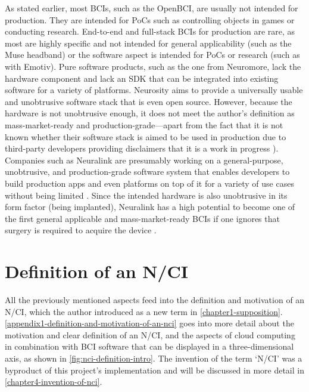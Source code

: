 As stated earlier, most BCIs, such as the OpenBCI, are usually not intended for production. They are intended for PoCs such as controlling objects in games or conducting research. End-to-end and full-stack BCIs for production are rare, as most are highly specific and not intended for general applicability (such as the Muse headband) or the software aspect is intended for PoCs or research (such as with Emotiv). Pure software products, such as the one from Neuromore, lack the hardware component and lack an SDK that can be integrated into existing software for a variety of platforms. Neurosity aims to provide a universally usable and unobtrusive software stack that is even open source. However, because the hardware is not unobtrusive enough, it does not meet the author’s definition as mass-market-ready and production-grade—apart from the fact that it is not known whether their software stack is aimed to be used in production \citep{neurosity_neurosity_2022} due to third-party developers providing disclaimers that it is a work in progress \citep{turney_notion_2022}). Companies such as Neuralink are presumably working on a general-purpose, unobtrusive, and production-grade software system that enables developers to build production apps and even platforms on top of it for a variety of use cases without being limited \citep{musk_integrated_2019}. Since the intended hardware is also unobtrusive in its form factor (being implanted), Neuralink has a high potential to become one of the first general applicable and mass-market-ready BCIs if one ignores that surgery is required to acquire the device \citep{neuralink_approach_nodate}.

\section{Definition of an N/CI}
\label{chapter2-definition-of-an-nci}

All the previously mentioned aspects feed into the definition and motivation of an N/CI, which the author introduced as a new term in \autoref{chapter1-supposition}. \autoref{appendix1-definition-and-motivation-of-an-nci} goes into more detail about the motivation and clear definition of an N/CI, and the aspects of cloud computing in combination with BCI software that can be displayed in a three-dimensional axis, as shown in \autoref{fig:nci-definition-intro}. The invention of the term ‘N/CI’ was a byproduct of this project’s implementation and will be discussed in more detail in \autoref{chapter4-invention-of-nci}.

